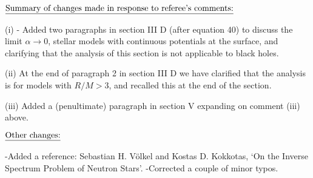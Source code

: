 \bigskip\bigskip


\noindent $\underline{\hbox{Summary of changes made in response to referee's comments:}}  $
\medskip

\smallskip
(i) - Added two paragraphs in section III D (after equation 40) to discuss the limit $\alpha \rightarrow0$,  stellar models with continuous potentials at the surface, and clarifying that the analysis of this section is not applicable to black holes. 

\bigskip
(ii)  At the end of paragraph 2 in section III D we have clarified that the analysis is for models with $R/M>3$, and recalled this at the end of the section. 

\bigskip
(iii) Added a (penultimate) paragraph in section V expanding on comment (iii) above. 






\bigskip\bigskip


\noindent $\underline{\hbox{Other changes:}}  $
\medskip

\smallskip
-Added a reference: Sebastian H. V{\"o}lkel and Kostas D. Kokkotas, `On the Inverse Spectrum Problem of Neutron Stars'.
\bigskip
-Corrected a couple of minor typos. 



\vfill \eject \bye






